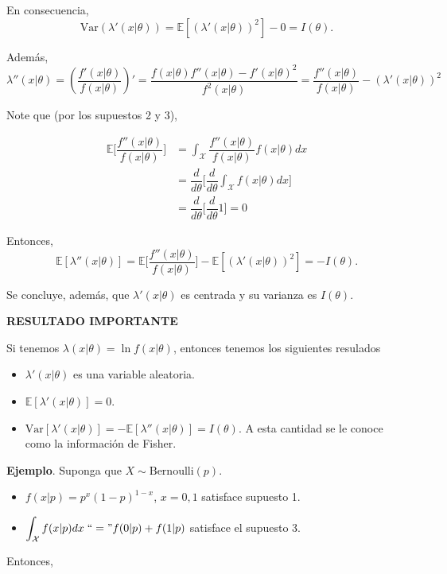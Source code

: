 \documentclass[
  12pt,
]{book}
\providecommand{\tightlist}{%
  \setlength{\itemsep}{0pt}\setlength{\parskip}{0pt}}
\begin{document}
En consecuencia,
\[\text{Var}(\lambda'(x|\theta)) = \mathbb E[(\lambda'(x|\theta))^2]-0 = I(\theta).\]

Además,
\[\lambda''(x|\theta)= \left(\dfrac{f'(x|\theta)}{f(x|\theta)}\right)' = \dfrac{f(x|\theta)f''(x|\theta)-f'(x|\theta)^2}{f^2(x|\theta)} =\dfrac{f''(x|\theta)}{f(x|\theta)} - (\lambda'(x|\theta))^2 \]

Note que (por los supuestos 2 y 3),

\begin{align*}
\mathbb E\bigg[\dfrac{f''(x|\theta)}{f(x|\theta)} \bigg] & = \int_{\mathcal X}\dfrac{f''(x|\theta)}{f(x|\theta)} f(x|\theta)dx \\
&=\dfrac{d}{d\theta}\bigg[\dfrac{d}{d\theta}\int_{\mathcal X}f(x|\theta)dx\bigg]\\
& = \dfrac{d}{d\theta}\bigg[\dfrac{d}{d\theta}1\bigg] = 0
\end{align*}

Entonces,
\[\mathbb E[\lambda''(x|\theta)] =\mathbb E\bigg[\dfrac{f''(x|\theta)}{f(x|\theta)} \bigg] - \mathbb E[(\lambda'(x|\theta))^2] = -I(\theta). \]

Se concluye, además, que \(\lambda'(x|\theta)\) es centrada y su varianza es \(I(\theta)\).

\textbf{RESULTADO IMPORTANTE}

Si tenemos \(\lambda(x\vert \theta) = \ln f(x\vert \theta)\), entonces tenemos los siguientes resulados

\begin{itemize}
\tightlist
\item
  \(\lambda'(x\vert \theta)\) es una variable aleatoria.
\item
  \(\mathbb{E}[\lambda'(x\vert \theta)] =0\).
\item
  \(\mathrm{Var}[\lambda'(x\vert \theta)] = - \mathbb E[\lambda''(x|\theta)] = I(\theta)\). A esta cantidad se le conoce como la información de Fisher.
\end{itemize}

\textbf{Ejemplo}. Suponga que \(X\sim \text{Bernoulli}(p)\).

\begin{itemize}
\item
  \(f(x|p) = p^x(1-p)^{1-x}\), \(x=0,1\) satisface supuesto 1.
\item
  \(\displaystyle\int_{\mathcal X}f(x|p)dx \;``=" f(0|p)+f(1|p)\) satisface el supuesto 3.
\end{itemize}

Entonces,
\end{document}
